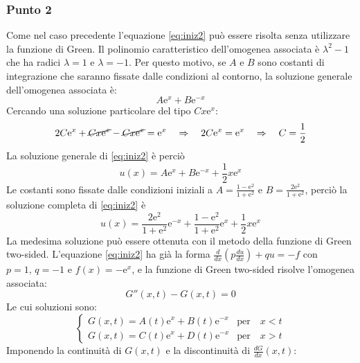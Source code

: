 \documentclass[]{scrartcl}
\begin{document}
\subsubsection*{Punto 2}
Come nel caso precedente l'equazione \eqref{eq:iniz2} può essere risolta senza utilizzare la funzione di Green. Il polinomio caratteristico dell'omogenea associata è $ \lambda^2 -1 $ che ha radici $ \lambda = 1 $ e $ \lambda = -1 $. Per questo motivo, se $ A $ e $ B $ sono costanti di integrazione che saranno fissate dalle condizioni al contorno, la soluzione generale dell'omogenea associata è:
\[	A\mathrm{e}^x + B\mathrm{e}^{-x}	\]
Cercando una soluzione particolare del tipo $ Cx\mathrm{e}^x $:
\[2C\mathrm{e}^x + \cancel{Cx\mathrm{e}^x} - \cancel{Cx\mathrm{e}^x} = \mathrm{e}^x \quad \Rightarrow \quad 2C\mathrm{e}^x = \mathrm{e}^x \quad \Rightarrow \quad C=\frac{1}{2}  \]
La soluzione generale di \eqref{eq:iniz2} è perciò 
\begin{equation}
u(x) = A\mathrm{e}^{x} + B \mathrm{e}^{-x} + \frac{1}{2}x\mathrm{e}^x
\label{eq:soluz_generale_costanti_2}
\end{equation}
Le costanti sono fissate dalle condizioni iniziali a $ A = \frac{1-\mathrm{e}^2}{1+\mathrm{e}^2} $ e $ B = \frac{2\mathrm{e}^2}{1+\mathrm{e}^2} $, perciò la soluzione completa di \eqref{eq:iniz2} è 
\begin{equation}
u(x) = \frac{2\mathrm{e}^2}{1+\mathrm{e}^2}  \mathrm{e}^{-x} +  \frac{1-\mathrm{e}^2}{1+\mathrm{e}^2}\mathrm{e}^x + \frac{1}{2}x\mathrm{e}^x
\label{eq:soluz_generale_costanti_completa_2}
\end{equation}
La medesima soluzione può essere ottenuta con il metodo della funzione di Green two-sided.
L'equazione \eqref{eq:iniz2} ha già la forma $ \frac{d}{dx}\left( p \frac{du}{dx}	\right) + qu = -f $ con $ p=1,\,q=-1 $ e $ f(x)=-\mathrm{e}^x $, e la funzione di Green two-sided risolve l'omogenea associata:
\begin{equation}
G''(x,t)-G(x,t)=0
\label{eq:green_two_sieded}
\end{equation}
Le cui soluzioni sono:
\begin{equation}
\begin{cases}
G(x,t) = A(t)\mathrm{e}^x + B(t)\mathrm{e}^{-x} & \text{per} \quad x<t  \\
G(x,t) = C(t)\mathrm{e}^x + D(t)\mathrm{e}^{-x}  & \text{per} \quad x>t  
\label{eq:green_two_sided}
\end{cases}{}
\end{equation}
Imponendo la continuità di $ G(x,t) $ e la discontinuità di $ \frac{dG}{dx}(x,t) $:
\end{document}
